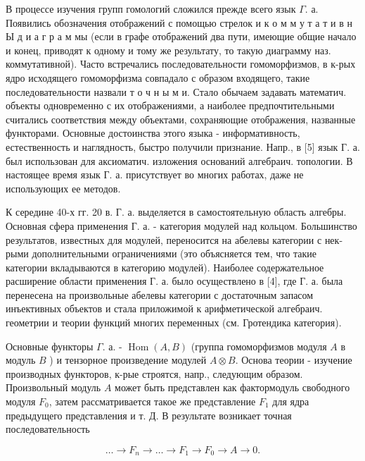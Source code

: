 \documentclass[10pt]{article}
\begin{document}
В процессе изучения групп гомологий сложился прежде всего язык $\Gamma$. а. Появились обозначения отображений с помощью стрелок и к о м м у т а т и в н Ы д и а г р а м мы (если в графе отображений два пути, имеющие общие начало и конец, приводят к одному и тому же результату, то такую диаграмму наз. коммутативной). Часто встречались последовательности гомоморфизмов, в к-рых ядро исходящего гомоморфизма совпадало с образом входящего, такие последовательности назвали т о ч н ы м и. Стало обычаем задавать математич. объекты одновременно с их отображениями, а наиболее предпочтительными считались соответствия между объектами, сохраняющие отображения, названные функторами. Основные достоинства этого языка - информативность, естественность и наглядность, быстро получили признание. Напр., в [5] язык Г. а. был использован для аксиоматич. изложения оснований алгебраич. топологии. В настоящее время язык Г. а. присутствует во многих работах, даже не использующих ее методов.



К середине 40-х гг. 20 в. Г. а. выделяется в самостоятельную область алгебры. Основная сфера применения Г. а. - категория модулей над кольцом. Большинство результатов, известных для модулей, переносится на абелевы категории с нек-рыми дополнительными ограничениями (это объясняется тем, что такие категории вкладываются в категорию модулей). Наиболее содержательное расширение области применения Г. а. было осуществлено в [4], где Г. а. была перенесена на произвольные абелевы категории с достаточным запасом инъективных объектов и стала приложимой к арифметической алгебраич. геометрии и теории функций многих переменных (см. Гротендика категория).



Основные функторы $\Gamma$. а. - $\operatorname{Hom}(A, B)$ (группа гомоморфизмов модуля $A$ в модуль $B$ ) и тензорное произведение модулей $A \otimes B$. Основа теории - изучение производных функторов, к-рые строятся, напр., следующим образом. Произвольный модуль $A$ может быть представлен как фактормодуль свободного модуля $F_{0}$, затем рассматривается такое же представление $F_{1}$ для ядра предыдущего представления и т. Д. В результате возникает точная последовательность



\[

\ldots \longrightarrow F_{n} \longrightarrow \ldots \longrightarrow F_{1} \longrightarrow F_{0} \longrightarrow A \longrightarrow 0 .

\]
\end{document}
